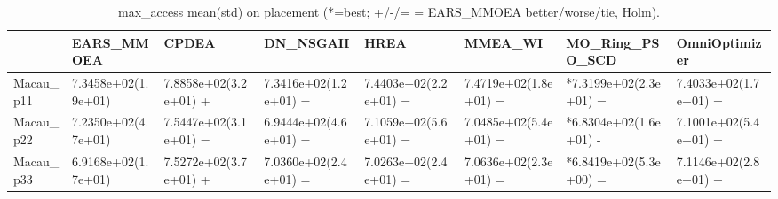 \begin{table}[t]
\centering
\caption{max_access mean(std) on placement (*=best; +/-/= = EARS_MMOEA better/worse/tie, Holm).}
\label{tab:placement_max_access}
\begin{tabular}{llllllll}
\toprule
 & EARS\_MMOEA & CPDEA & DN\_NSGAII & HREA & MMEA\_WI & MO\_Ring\_PSO\_SCD & OmniOptimizer \\
\midrule
Macau\_p11 & 7.3458e+02(1.9e+01) & 7.8858e+02(3.2e+01) + & 7.3416e+02(1.2e+01) = & 7.4403e+02(2.2e+01) = & 7.4719e+02(1.8e+01) = & *7.3199e+02(2.3e+01) = & 7.4033e+02(1.7e+01) = \\
Macau\_p22 & 7.2350e+02(4.7e+01) & 7.5447e+02(3.1e+01) = & 6.9444e+02(4.6e+01) = & 7.1059e+02(5.6e+01) = & 7.0485e+02(5.4e+01) = & *6.8304e+02(1.6e+01) - & 7.1001e+02(5.4e+01) = \\
Macau\_p33 & 6.9168e+02(1.7e+01) & 7.5272e+02(3.7e+01) + & 7.0360e+02(2.4e+01) = & 7.0263e+02(2.4e+01) = & 7.0636e+02(2.3e+01) = & *6.8419e+02(5.3e+00) = & 7.1146e+02(2.8e+01) + \\
\bottomrule
\end{tabular}
\end{table}
